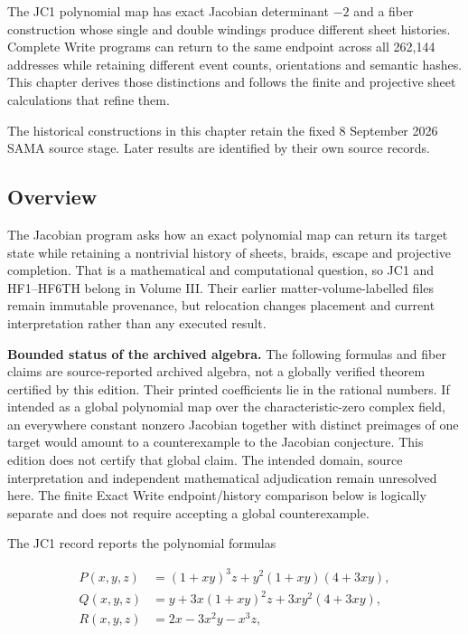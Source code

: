 \label{viii-ch11-jacobian-maps-return-and-retained-history}

The JC1 polynomial map has exact Jacobian determinant $-2$ and a fiber construction whose single and double windings produce different sheet histories. Complete Write programs can return to the same endpoint across all 262,144 addresses while retaining different event counts, orientations and semantic hashes. This chapter derives those distinctions and follows the finite and projective sheet calculations that refine them.

The historical constructions in this chapter retain the fixed 8 September 2026 SAMA source stage. Later results are identified by their own source records.

\subsection{Overview}\label{viii-ch11-overview}

The Jacobian program asks how an exact polynomial map can return its
target state while retaining a nontrivial history of sheets, braids,
escape and projective completion. That is a mathematical and
computational question, so JC1 and HF1--HF6TH belong in Volume III.
Their earlier matter-volume-labelled files remain immutable provenance,
but relocation changes placement and current interpretation rather than
any executed result.

\textbf{Bounded status of the archived algebra.} The following formulas
and fiber claims are source-reported archived algebra, not a globally
verified theorem certified by this edition. Their printed coefficients
lie in the rational numbers. If intended as a global polynomial map over
the characteristic-zero complex field, an everywhere constant nonzero
Jacobian together with distinct preimages of one target would amount to
a counterexample to the Jacobian conjecture. This edition does not
certify that global claim. The intended domain, source interpretation
and independent mathematical adjudication remain unresolved here. The
finite Exact Write endpoint/history comparison below is logically
separate and does not require accepting a global counterexample.

The JC1 record reports the polynomial formulas

\[
\begin{aligned}
P(x,y,z)&=(1+xy)^3z+y^2(1+xy)(4+3xy),\\
Q(x,y,z)&=y+3x(1+xy)^2z+3xy^2(4+3xy),\\
R(x,y,z)&=2x-3x^2y-x^3z,
\end{aligned}
\]

